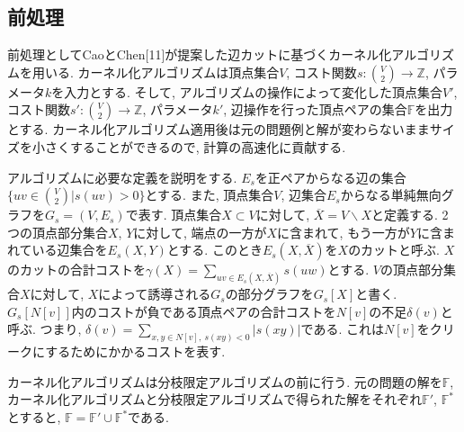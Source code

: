 \documentclass[10.5,a4paper,titlepage, dvipdfmx]{bxjsarticle}
\begin{document}
\subsection{前処理}
前処理としてCaoとChen[11]が提案した辺カットに基づくカーネル化アルゴリズムを用いる.
カーネル化アルゴリズムは頂点集合$V$, コスト関数$s:\binom{V}{2} \rightarrow \mathbb{Z}$, パラメータ$k$を入力とする.
そして, アルゴリズムの操作によって変化した頂点集合$V'$, コスト関数$s':\binom{V}{2} \rightarrow \mathbb{Z}$, パラメータ$k'$, 辺操作を行った頂点ペアの集合$\mathbb{F}$を出力とする.
カーネル化アルゴリズム適用後は元の問題例と解が変わらないままサイズを小さくすることができるので, 計算の高速化に貢献する.\par
アルゴリズムに必要な定義を説明をする.
$E_s$を正ペアからなる辺の集合$\{uv \in \binom{V}{2} | s(uv) > 0 \}$とする.
また, 頂点集合$V$, 辺集合$E_s$からなる単純無向グラフを$G_s=(V,E_s)$で表す.
頂点集合$X \subset V$に対して, $\overline{X} = V \backslash X$と定義する.
2つの頂点部分集合$X$, $Y$に対して, 端点の一方が$X$に含まれて, もう一方が$Y$に含まれている辺集合を$E_s(X,Y)$とする.
このとき$E_s(X,\overline{X})$を$X$のカットと呼ぶ.
$X$のカットの合計コストを$\gamma(X)=\sum_{uv \in E_s(X,\overline{X})} s(uw)$とする.
$V$の頂点部分集合$X$に対して, $X$によって誘導される$G_s$の部分グラフを$G_s[X]$と書く.
$G_s[N[v]]$内のコストが負である頂点ペアの合計コストを$N[v]$の不足$\delta(v)$と呼ぶ.
つまり, $\delta(v) = \sum_{x,y \in N[v], \ s(xy) < 0} |s(xy)|$である.
これは$N[v]$をクリークにするためにかかるコストを表す.\par
カーネル化アルゴリズムは分枝限定アルゴリズムの前に行う.
元の問題の解を$\mathbb{F}$, カーネル化アルゴリズムと分枝限定アルゴリズムで得られた解をそれぞれ$\mathbb{F'}$, $\mathbb{F^*}$とすると, $\mathbb{F}=\mathbb{F'} \cup \mathbb{F^*}$である.
\end{document}

